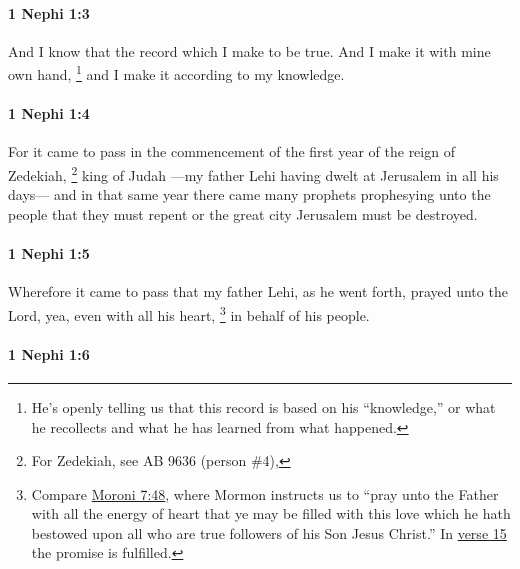 		\paragraph{1 Nephi 1:3} %
			\label{1NEPHI-1-3}

			And I know that the record which I make to be true.
			And I make it with mine own hand,
				\footnote{%
					He's openly telling us that this record is based on his ``knowledge,'' or what he recollects and what he has learned from what happened.
					}%
			and I make it according to my knowledge.

		\paragraph{1 Nephi 1:4} %
			\label{1NEPHI-1-4}

			For it came to pass in the commencement of the first year
			of the reign of Zedekiah,%
			\footnote{%
				For Zedekiah, see AB 9636 (person \#4), 
				}
			king of Judah
			---my father Lehi having dwelt at Jerusalem in all his days---
			and in that same year there came many prophets prophesying unto the people
			that they must repent or the great city Jerusalem must be destroyed.

		\paragraph{1 Nephi 1:5} %
			\label{1NEPHI-1-5}

			Wherefore it came to pass that
			my father Lehi, as he went forth, prayed unto the Lord,
			yea, even with all his heart,%
				\footnote{%
					Compare \hyperref[MORONI-7-48]{Moroni 7:48}, where Mormon instructs us to ``pray unto the Father with all the energy of heart that ye may be filled with this love which he hath bestowed upon all who are true followers of his Son Jesus Christ.'' In \hyperref[1NEPHI-1-15]{verse 15} the promise is fulfilled.
					}
			in behalf of his people.

		\paragraph{1 Nephi 1:6} %
			\label{1NEPHI-1-6}

